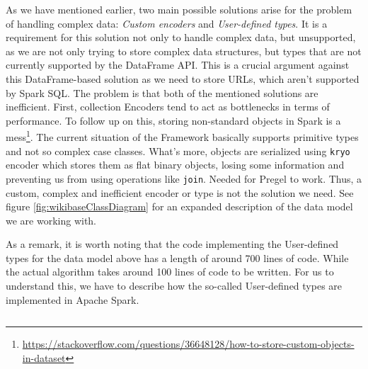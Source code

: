 As we have mentioned earlier, two main possible solutions arise for the problem of handling complex data: \textit{Custom encoders} and \textit{User-defined types}. It is a requirement for this solution not only to handle complex data, but unsupported, as we are not only trying to store complex data structures, but types that are not currently supported by the DataFrame API. This is a crucial argument against this DataFrame-based solution as we need to store URLs, which aren't supported by Spark SQL. The problem is that both of the mentioned solutions are inefficient. First, collection Encoders tend to act as bottlenecks in terms of performance. To follow up on this, storing non-standard objects in Spark is a mess\footnote{\url{https://stackoverflow.com/questions/36648128/how-to-store-custom-objects-in-dataset}}. The current situation of the Framework basically supports primitive types and not so complex case classes. What's more, objects are serialized using \texttt{kryo} encoder which stores them as flat binary objects, losing some information and preventing us from using operations like \texttt{join}. Needed for Pregel to work. Thus, a custom, complex and inefficient encoder or type is not the solution we need. See figure \ref{fig:wikibaseClassDiagram} for an expanded description of the data model we are working with.

As a remark, it is worth noting that the code implementing the User-defined types for the data model above has a length of around 700 lines of code. While the actual algorithm takes around 100 lines of code to be written. For us to understand this, we have to describe how the so-called User-defined types are implemented in Apache Spark.

\begin{code}
    \inputminted{scala}{code/listings/8-1_udt.scala}
\end{code}

